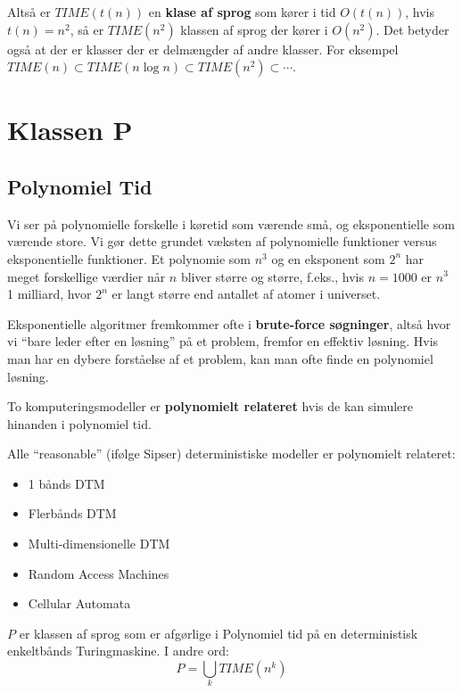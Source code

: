 Altså er $TIME(t(n))$ en \textbf{klase af sprog} som kører i tid $O(t(n))$, hvis $t(n) = n^{2}$, så er $TIME(n^{2})$ klassen af sprog der kører i $O(n^{2})$. Det betyder også at der er klasser der er delmængder af andre klasser. For eksempel $TIME(n) \subset TIME(n \log n) \subset TIME(n^{2}) \subset \cdots$.


\section{Klassen P}%
\label{sec:p}

\subsection{Polynomiel Tid}%
\label{subsec:polynomialtime}

Vi ser på polynomielle forskelle i køretid som værende små, og eksponentielle som værende store. Vi gør dette grundet væksten af polynomielle funktioner versus eksponentielle funktioner. Et polynomie som $n^{3}$ og en eksponent som $2^{n}$ har meget forskellige værdier når $n$ bliver større og større, f.eks., hvis $n = 1000$ er $n^{3}$ 1 milliard, hvor $2^{n}$ er langt større end antallet af atomer i universet.

Eksponentielle algoritmer fremkommer ofte i \textbf{brute-force søgninger}, altså hvor vi ``bare leder efter en løsning'' på et problem, fremfor en effektiv løsning. Hvis man har en dybere forståelse af et problem, kan man ofte finde en polynomiel løsning.

\begin{definition}
To komputeringsmodeller er \textbf{polynomielt relateret} hvis de kan simulere hinanden i polynomiel tid.
\end{definition}

Alle ``reasonable'' (ifølge Sipser) deterministiske modeller er polynomielt relateret:
\begin{itemize}
  \item 1 bånds DTM
  \item Flerbånds DTM
  \item Multi-dimensionelle DTM
  \item Random Access Machines
  \item Cellular Automata
\end{itemize}

\begin{definition}[Klassen $P$]
	$P$ er klassen af sprog som er afgørlige i Polynomiel tid på en deterministisk enkeltbånds Turingmaskine. I andre ord:
	\begin{equation*}
		P = \bigcup_{k} TIME(n^{k})
	\end{equation*}
\end{definition}

